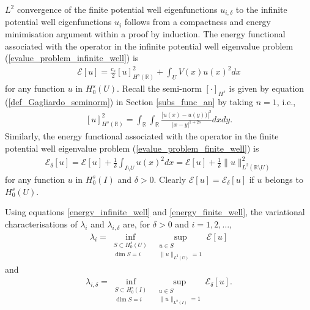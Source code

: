 \documentclass[preprint,12pt]{elsarticle}
\newcommand{\R}{\mathbb R}
\begin{document}
$L^2$ convergence of the finite potential well eigenfunctions $u_{i,\delta}$ to the infinite potential well eigenfunctions $u_i$ follows from a compactness and energy minimisation argument within a proof by induction.
The energy functional associated with the operator in the infinite potential well eigenvalue problem (\ref{evalue_problem_infinite_well}) is
\begin{align}\label{energy_infinite_well}
    \mathcal{E}[u]=\frac{c_s}{2}[u]^2_{H^s(\R)}+\int_{U}V(x)u(x)^2dx
\end{align}
for any function $u$ in $H^s_0(U)$. Recall the semi-norm $[\cdot]_{H^s}$ is given by equation (\ref{def_Gagliardo_seminorm}) in Section \ref{subs_func_an} by taking $n=1$, i.e.,
\begin{align}\label{seminorm}
    [u]^2_{H^s(\R)}=\int_{\R}\int_{\R}\frac{|u(x)-u(y))|^2}{|x-y|^{1+2s}}dxdy.
\end{align}
Similarly, the energy functional associated with the operator in the finite potential well eigenvalue problem (\ref{evalue_problem_finite_well}) is
\begin{align}\label{energy_finite_well}
    \mathcal{E}_{\delta}[u]=\mathcal{E}[u]+\frac{1}{\delta}\int_{I\setminus U} u(x)^2dx=\mathcal{E}[u]+\frac{1}{\delta}\|u\|^2_{L^2(\R\setminus U)}
\end{align}
for any function $u$ in $H^s_0(I)$ and $\delta>0$. Clearly $\mathcal{E}[u]=\mathcal{E}_{\delta}[u]$ if $u$ belongs to $H^s_0(U)$.

Using equations \eqref{energy_infinite_well} and
\eqref{energy_finite_well}, the variational characterisations of
$\lambda_i$ and $\lambda_{i,\delta}$ are, for $\delta>0$ and
$i=1,2,\ldots$,
\begin{align}\label{var_char_lambda_i}
    \lambda_i
    =
    \inf_{\substack{S\subset H_0^s(U)\\ \dim S=i}}
    \;
    \sup_{\substack{u\in S\\ \|u\|_{L^2(U)}=1}}
    \mathcal E[u]
\end{align}
and
\begin{align}\label{var_char_lambda_idelta}
    \lambda_{i,\delta}
    =
    \inf_{\substack{S\subset H_0^s(I)\\ \dim S=i}}
    \;
    \sup_{\substack{u\in S\\ \|u\|_{L^2(I)}=1}}
    \mathcal E_\delta[u].
\end{align}
\end{document}

